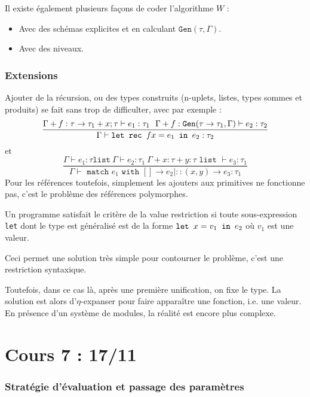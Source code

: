 \documentclass{cours}
\begin{document}
Il existe également plusieurs façons de coder l'algorithme $W$ :
\begin{itemize}
    \item Avec des schémas explicites et en calculant $\texttt{Gen}(\tau, \Gamma)$.
    \item Avec des niveaux.
\end{itemize}

\section{Extensions}
Ajouter de la récursion, ou des types construits (n-uplets, listes, types sommes et produits) se fait sans trop de difficulter, avec par exemple :
\[
    \frac{\Gamma + f : \tau \rightarrow \tau_{1} + x ; \tau \vdash e_{1} : \tau_{1} \ \ \Gamma + f : \texttt{Gen}(\tau \rightarrow \tau_{1}, \Gamma) \vdash e_{2} : \tau_{2}}{\Gamma \vdash \texttt{let } \texttt{rec } f x = e_{1} \texttt{ in } e_{2} : \tau_{2}}
\]
et
\[
    \frac{\Gamma \vdash e_{1} : \tau \texttt{list} \ \Gamma \vdash e_{2} : \tau_{1} \ \Gamma + x : \tau + y : \tau \texttt{ list } \vdash e_{3} : \tau_{1}}{\Gamma \vdash \texttt{ match } e_{1} \texttt{ with } \left[\right] \rightarrow e_{2} \mid ::(x, y) \rightarrow e_{3} : \tau_{1}}
\]
Pour les références toutefois, simplement les ajouters aux primitives ne fonctionne pas, c'est le problème des références polymorphes.

\begin{definition}
    Un programme satisfait le critère de la value restriction si toute sous-expression \texttt{let} dont le type est généralisé est de la forme $\texttt{let } x = v_{1} \texttt{ in } e_{2}$ où $v_{1}$ est une valeur.
\end{definition}
Ceci permet une solution très simple pour contourner le problème, c'est une restriction syntaxique.

Toutefois, dans ce cas là, après une première unification, on fixe le type. La solution est alors d'$\eta$-expanser pour faire apparaître une fonction, i.e. une valeur. En présence d'un système de modules, la réalité est encore plus complexe.


\part[Mode de Passage des Paramètres]{Cours 7 : 17/11}
\section{Stratégie d'évaluation et passage des paramètres}
\end{document}
